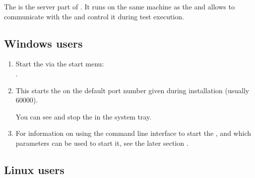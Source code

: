 % 
%
%

\label{otherportnumber}
The \gdagent{} is the server part of \jb{}. It runs on the same machine as the \gdaut{} and allows \jb{} to communicate with the \gdaut{} and control it during test execution. 

\subsection{Windows users}
\begin{enumerate}
\item Start the \gdagent{} via the start menu:\\
. 

\item This starts the \gdserver on the 
default port number given during installation (usually 60000).

You can see and stop the \gdagent{} in the system tray.  

\item  For information on using the command line interface to start the \gdserver, and which parameters can be used to start it, see the later section . 
\end{enumerate}

\subsection{Linux users}

